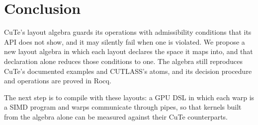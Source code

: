 \section{Conclusion}\label{sec:conclusion}

CuTe's layout algebra guards its operations with admissibility conditions
that its API does not show, and it may silently fail when one is violated.
We propose a new layout algebra in which each layout declares the space it
maps into, and that declaration alone reduces those conditions to one. The
algebra still reproduces CuTe's documented examples and CUTLASS's atoms, and
its decision procedure and operations are proved in Rocq.

The next step is to compile with these layouts: a GPU DSL in which each warp
is a SIMD program and warps communicate through pipes, so that kernels built
from the algebra alone can be measured against their CuTe counterparts.
